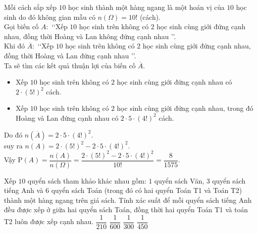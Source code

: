 \begin{vd}
{		\noindent
		Mỗi cách sắp xếp $10$ học sinh thành một hàng ngang là một hoán vị của $10$ học sinh do đó không gian mẫu có
		$n(\Omega)=10!$ (cách).\\
		Gọi biến cố $A\colon$ \lq \lq Xếp $10$ học sinh trên không có $2$ học sinh cùng giới đứng cạnh nhau, đồng thời Hoàng và Lan không đứng cạnh nhau \rq \rq.\\
		Khi đó $\overline{A}\colon$ \lq \lq Xếp $10$ học sinh trên không có $2$ học sinh cùng giới đứng cạnh nhau, đồng thời Hoàng và Lan đứng cạnh nhau \rq \rq.\\
		Ta sẽ tìm các kết quả thuận lợi của biến cố $\overline{A}$. 
		\begin{itemize}
			\item Xếp $10$ học sinh trên không có $2$ học sinh cùng giới đứng cạnh nhau có $2\cdot (5!)^2$ cách.
			\item Xếp $10$ học sinh trên không có $2$ học sinh cùng giới đứng cạnh nhau, trong đó Hoàng và Lan đứng cạnh nhau có $2\cdot 5 \cdot (4!)^2$ cách.
		\end{itemize}
		Do đó $n(\overline{A})=2\cdot 5 \cdot (4!)^2$.\\
		suy ra $n(A)=2\cdot (5!)^2 -2\cdot 5 \cdot (4!)^2 $.\\
		Vậy $\mathrm{P}(A)=\dfrac{n(A)}{n(\Omega)}=\dfrac{2\cdot (5!)^2 -2\cdot 5 \cdot (4!)^2}{10!}=\dfrac{8}{1575}$.
	}
\end{vd}


\begin{bt}%
	Xếp $10$ quyển sách tham khảo khác nhau gồm: $ 1 $ quyển sách Văn, $ 3 $ quyển sách tiếng Anh và $ 6 $ quyển sách Toán (trong đó có hai quyển Toán T1 và Toán T2) thành một hàng ngang trên giá sách. Tính xác suất để mỗi quyển sách tiếng Anh đều được xếp ở giữa hai quyển sách Toán, đồng thời hai quyển Toán T1 và toán T2 luôn được xếp cạnh nhau.
	\choice
	{\True $\dfrac{1}{210}$}
	{$\dfrac{1}{600}$}
	{$\dfrac{1}{300}$}
	{$\dfrac{1}{450}$}
\end{bt}


